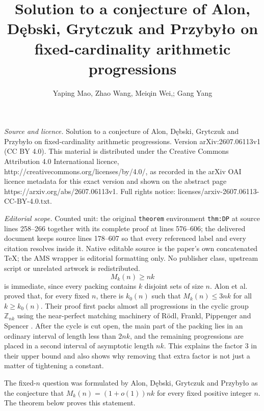 \documentclass[10pt,a4paper]{amsart}
\numberwithin{equation}{section}
\begin{document}
\title[Solution to a conjecture of Alon, Dkebski, Grytczuk and Przy]{Solution to a conjecture of Alon, D\k{e}bski, Grytczuk and Przyby\l{}o on fixed-cardinality arithmetic progressions}
\author{Yaping Mao, Zhao Wang, Meiqin Wei,; Gang Yang}
\date{}
\maketitle
\noindent\emph{Source and licence.} Solution to a conjecture of Alon, D\k{e}bski, Grytczuk and Przyby\l{}o on fixed-cardinality arithmetic progressions. Version arXiv:2607.06113v1 (CC BY 4.0). This material is distributed under the Creative Commons Attribution 4.0 International licence, http://creativecommons.org/licenses/by/4.0/, as recorded in the arXiv OAI licence metadata for this exact version and shown on the abstract page https://arxiv.org/abs/2607.06113v1. Full rights notice: licenses/arxiv-2607.06113-CC-BY-4.0.txt.\par\smallskip
\noindent\textit{Editorial scope.} Counted unit: the original \texttt{theorem} environment \texttt{thm:DP} at source lines 258--266 together with its complete proof at lines 576--606; the delivered document keeps source lines 178--607 so that every referenced label and every citation resolves inside it. Native editable source is the paper's own concatenated TeX; the AMS wrapper is editorial formatting only. No publisher class, upstream script or unrelated artwork is redistributed.
\begin{equation}\label{eq:lower-bound}
        M_k(n)\ge nk
\end{equation}
is immediate, since every packing contains $k$ disjoint sets of size $n$.
Alon et al. proved that, for every fixed $n$, there is $k_0(n)$ such that
$M_k(n)\le 3nk$ for all $k\ge k_0(n)$.  Their proof first packs almost all
progressions in the cyclic group $\mathbb Z_{nk}$ using the near-perfect
matching machinery of R\"odl, Frankl, Pippenger and Spencer
\cite{FranklRodl,PippengerSpencer,Rodl}.  After the cycle is cut open, the
main part of the packing lies in an ordinary interval of length less than
$2nk$, and the remaining progressions are placed in a second interval of
asymptotic length $nk$.  This explains the factor $3$ in their upper bound and
also shows why removing that extra factor is not just a matter of tightening a
constant.

The fixed-$n$ question was formulated by Alon, D\k{e}bski, Grytczuk and
Przyby\l{}o as the conjecture that $M_k(n)=(1+o(1))nk$ for every fixed
positive integer $n$.  The theorem below proves this statement.
\end{document}
